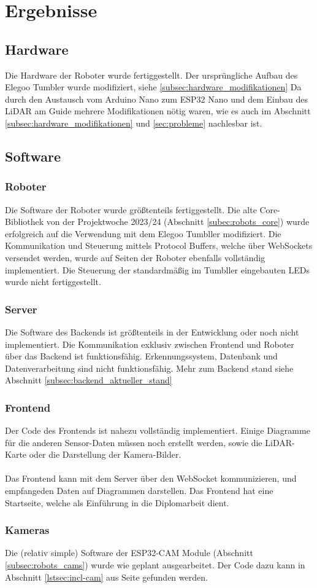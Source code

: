 \chapter{Ergebnisse}

\section{Hardware}
Die Hardware der Roboter wurde fertiggestellt.
Der ursprüngliche Aufbau des Elegoo Tumbler wurde modifiziert, siehe \ref{subsec:hardware_modifikationen}
Da durch den Austausch vom Arduino Nano zum ESP32 Nano und dem Einbau des LiDAR am Guide
mehrere Modifikationen nötig waren,
wie es auch im Abschnitt \ref{subsec:hardware_modifikationen} und \ref{sec:probleme} nachlesbar ist.
\section{Software}

\subsection{Roboter}
Die Software der Roboter wurde größtenteils fertiggestellt.
%
Die alte Core-Bibliothek von der Projektwoche 2023/24 (Abschnitt \ref{subec:robots_core})
wurde erfolgreich auf die Verwendung mit dem Elegoo Tumbller modifiziert.
%
Die Kommunikation und Steuerung mittels Protocol Buffers,
welche über WebSockets versendet werden,
wurde auf Seiten der Roboter ebenfalls vollständig implementiert.
%
Die Steuerung der standardmäßig im Tumbller eingebauten LEDs wurde nicht fertiggestellt.
\subsection{Server}
Die Software des Backends ist größtenteils in der Entwicklung 
oder noch nicht implementiert.
% 
Die Kommunikation exklusiv zwischen Frontend und Roboter 
über das Backend ist funktionsfähig.
% 
Erkennungssystem, Datenbank und Datenverarbeitung sind nicht funktionsfähig.
% 
% 
Mehr zum Backend stand siehe Abschnitt \ref{subsec:backend_aktueller_stand}
% 
\subsection{Frontend}
Der Code des Frontends ist nahezu vollständig implementiert.
%
Einige Diagramme für die anderen Sensor-Daten müssen noch erstellt werden,
sowie die LiDAR-Karte oder die Darstellung der Kamera-Bilder.
%
\\\\
Das Frontend kann mit dem Server über den WebSocket kommunizieren,
und empfangeden Daten auf Diagrammen darstellen. 
%
Das Frontend hat eine Startseite, welche als Einführung in die Diplomarbeit dient.

\subsection{Kameras}
Die (relativ simple) Software der ESP32-CAM Module (Abschnitt \ref{subsec:robots_cams})
wurde wie geplant ausgearbeitet.
%
Der Code dazu kann in Abschnitt \ref{lstsec:incl-cam} aus Seite \pageref{lstsec:incl-cam} gefunden werden.